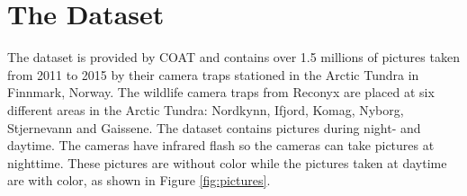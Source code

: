 \documentclass[USenglish]{uit-thesis}
\begin{document}








\chapter{The Dataset} \label{chap:data_set}
The dataset is provided by COAT and contains over 1.5 millions of pictures taken from 2011 to 2015 by their camera traps stationed in the Arctic Tundra in Finnmark, Norway. The wildlife camera traps from Reconyx are placed at six different areas in the Arctic Tundra: Nordkynn, Ifjord, Komag, Nyborg, Stjernevann and Gaissene.
The dataset contains pictures during night- and daytime. The cameras have infrared flash so the cameras can take pictures at nighttime. These pictures are without color while the pictures taken at daytime are with color, as shown in Figure \ref{fig:pictures}.
\end{document}
